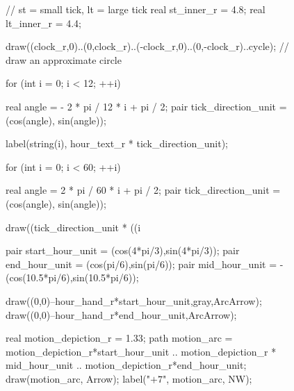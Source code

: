 \documentclass[../gatm.tex]{subfiles}
\begin{document}
\begin{figure}[h]
\begin{center}
\begin{minipage}[c]{0.35\textwidth}
\begin{center}
\begin{minipage}[b]{\textwidth}
\begin{asy}[width=0.7\textwidth]
						// st = small tick, lt = large tick
						real st_inner_r = 4.8;
						real lt_inner_r = 4.4;
						
						draw((clock_r,0)..(0,clock_r)..(-clock_r,0)..(0,-clock_r)..cycle); // draw an approximate circle
						
						for (int i = 0; i < 12; ++i) {
						real angle = - 2 * pi / 12 * i + pi / 2;
						pair tick_direction_unit = (cos(angle), sin(angle));
						
						label(string(i), hour_text_r * tick_direction_unit);
						}
						
						
						for (int i = 0; i < 60; ++i) {
						real angle = 2 * pi / 60 * i + pi / 2;
						pair tick_direction_unit = (cos(angle), sin(angle));
						
						draw((tick_direction_unit * ((i %
						}
						
						pair start_hour_unit = (cos(4*pi/3),sin(4*pi/3));
						pair end_hour_unit = (cos(pi/6),sin(pi/6));
						pair mid_hour_unit = -(cos(10.5*pi/6),sin(10.5*pi/6));
						
						draw((0,0)--hour_hand_r*start_hour_unit,gray,ArcArrow);
						draw((0,0)--hour_hand_r*end_hour_unit,ArcArrow);
						
						real motion_depiction_r = 1.33;
						path motion_arc = motion_depiction_r*start_hour_unit .. motion_depiction_r * mid_hour_unit .. motion_depiction_r*end_hour_unit;
						draw(motion_arc, Arrow);
						label("$+7$", motion_arc, NW);
					\end{asy}
				\end{minipage}
			\end{center}
			\vspace*{-2\baselineskip}
			\begin{center}
				\begin{minipage}[t]{\textwidth}
					\label{fig:clock_arithm}
				\end{minipage}
			\end{center}
		\end{minipage}
	\end{center}
	\vspace*{-2\baselineskip}
\end{figure}
\end{document}
